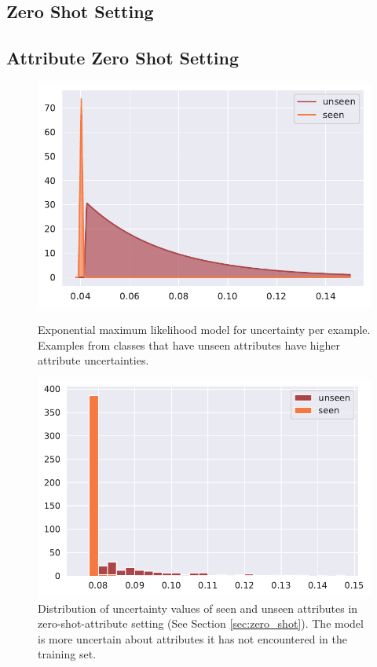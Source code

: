 \documentclass[a4paper,cleardoubleempty,BCOR1cm, 11pt]{report}
\begin{document}
\subsection{Zero Shot Setting}
\subsection{Attribute Zero Shot Setting}

\begin{figure}%
	\centering
	\begin{minipage}[t]{0.45\textwidth}
		\centering
		\includegraphics[width=1\textwidth]{images/attr_zero_shot_class_uncertainty.pdf} 
		\caption{Exponential maximum likelihood model for uncertainty per example. Examples from classes that have unseen attributes have higher attribute uncertainties.}
		\label{fig:unseen_attr_classes}
	\end{minipage}\hfill
	\begin{minipage}[t]{0.45\textwidth}
		\centering
		\includegraphics[width=1\textwidth]{images/attr_zero_shot_uncertainty_hist.pdf}
		\caption{Distribution of uncertainty values of seen and unseen attributes in zero-shot-attribute setting (See Section \ref{sec:zero_shot}). The model is more uncertain about attributes it has not encountered in the training set.}
		\label{fig:unseen_attrs}
	\end{minipage}
\end{figure}
\end{document}

